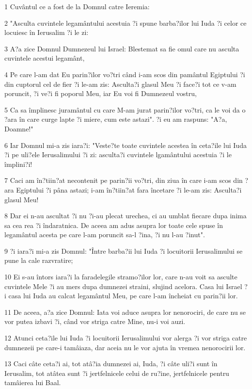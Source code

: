 \par 1 Cuvântul ce a fost de la Domnul catre Ieremia:
\par 2 "Asculta cuvintele legamântului acestuia ?i spune barba?ilor lui Iuda ?i celor ce locuiesc în Ierusalim ?i le zi:
\par 3 A?a zice Domnul Dumnezeul lui Israel: Blestemat sa fie omul care nu asculta cuvintele acestui legamânt,
\par 4 Pe care l-am dat Eu parin?ilor vo?tri când i-am scos din pamântul Egiptului ?i din cuptorul cel de fier ?i le-am zis: Asculta?i glasul Meu ?i face?i tot ce v-am poruncit, ?i ve?i fi poporul Meu, iar Eu voi fi Dumnezeul vostru,
\par 5 Ca sa împlinesc juramântul cu care M-am jurat parin?ilor vo?tri, ca le voi da o ?ara în care curge lapte ?i miere, cum este astazi". ?i eu am raspuns: "A?a, Doamne!"
\par 6 Iar Domnul mi-a zis iara?i: "Veste?te toate cuvintele acestea în ceta?ile lui Iuda ?i pe uli?ele Ierusalimului ?i zi: asculta?i cuvintele lgamântului acestuia ?i le împlini?i!
\par 7 Caci am în?tiin?at necontenit pe parin?ii vo?tri, din ziua în care i-am scos din ?ara Egiptului ?i pâna astazi; i-am în?tiin?at fara încetare ?i le-am zis: Asculta?i glasul Meu!
\par 8 Dar ei n-au ascultat ?i nu ?i-au plecat urechea, ci au umblat fiecare dupa inima sa cea rea ?i îndaratnica. De aceea am adus asupra lor toate cele spuse în legamântul acesta pe care l-am poruncit sa-l ?ina, ?i nu l-au ?inut".
\par 9 ?i iara?i mi-a zis Domnul: "Între barba?ii lui Iuda ?i locuitorii Ierusalimului se pune la cale razvratire;
\par 10 Ei s-au întors iara?i la faradelegile stramo?ilor lor, care n-au voit sa asculte cuvintele Mele ?i au mers dupa dumnezei straini, slujind acelora. Casa lui Israel ?i casa lui Iuda au calcat legamântul Meu, pe care l-am încheiat cu parin?ii lor.
\par 11 De aceea, a?a zice Domnul: Iata voi aduce asupra lor nenorociri, de care nu se vor putea izbavi ?i, când vor striga catre Mine, nu-i voi auzi.
\par 12 Atunci ceta?ile lui Iuda ?i locuitorii Ierusalimului vor alerga ?i vor striga catre dumnezeii pe care-i tamâiaza, dar aceia nu le vor ajuta în vremea nenorocirii lor.
\par 13 Caci câte ceta?i ai, tot atâ?ia dumnezei ai, Iuda, ?i câte uli?i sunt în Ierusalim, tot atâtea sunt ?i jertfelnicele celui de ru?ine, jertfelnicele pentru tamâierea lui Baal.
